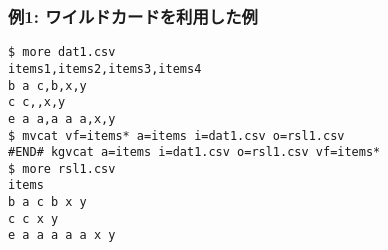 \subsubsection*{例1: ワイルドカードを利用した例}



\begin{Verbatim}[baselinestretch=0.7,frame=single]
$ more dat1.csv
items1,items2,items3,items4
b a c,b,x,y
c c,,x,y
e a a,a a a,x,y
$ mvcat vf=items* a=items i=dat1.csv o=rsl1.csv
#END# kgvcat a=items i=dat1.csv o=rsl1.csv vf=items*
$ more rsl1.csv
items
b a c b x y
c c x y
e a a a a a x y
\end{Verbatim}
